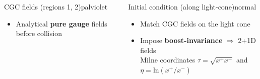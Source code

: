 \documentclass[aspectratio=169,11pt,usenames,dvipsnames]{beamer}
\begin{document}
\begin{frame}
\begin{columns}[onlytextwidth,t]
        \begin{custombox2}{{\normalsize CGC fields} {\tiny (regions 1, 2)}}{palviolet}
            \small
            \begin{varwidth}{0.93\textwidth}
            \begin{itemize}\itemsep0em 
                \footnotesize
                \item Analytical {\color{red}\bfseries pure gauge} fields before collision
            \end{itemize}
            \end{varwidth}
        \end{custombox2}

        \begin{custombox2}{{\normalsize Initial condition} {\tiny (along light-cone)}}{normal}
            \small
            \begin{varwidth}{0.93\textwidth}
            \begin{itemize}\itemsep0em 
                \footnotesize
                \item Match CGC fields on the light cone
                \item Impose {\bfseries boost-invariance} $\Rightarrow$ 2+1D fields\\
                {\tiny\color{lightgray} Milne coordinates {\color{Blue}$\tau=\sqrt{x^+x^-}$} and {\color{ForestGreen}$\eta=\mathrm{ln}(x^+/x^-)$}}
            \end{itemize}
            \end{varwidth}
        \end{custombox2}


\end{columns}
\end{frame}
\end{document}
